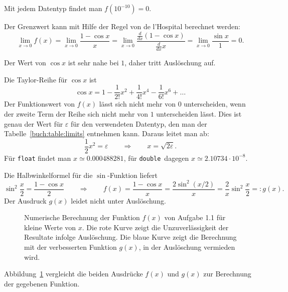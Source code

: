 \begin{loesung}
\begin{teilaufgaben}
\item
Mit jedem Datentyp findet man $f(10^{-10})=0$.
\item
Der Grenzwert kann mit Hilfe der Regel von de l'Hospital berechnet werden:
%
\[
\lim_{x\to 0}f(x)
=
\lim_{x\to 0}\frac{1-\cos x}{x}
=
\lim_{x\to 0}\frac{\frac{d}{dx}(1-\cos x)}{\frac{d}{dx} x}
=
\lim_{x\to 0} \frac{\sin x}{1} = 0.
\]
\item
Der Wert von $\cos x$ ist sehr nahe bei $1$, daher tritt Auslöschung auf.
\item
Die Taylor-Reihe für $\cos x$ ist
\[
\cos x = 1 -\frac1{2!}x^2 + \frac{1}{4!}x^4 - \frac{1}{6!}x^6 +\dots
\]
Der Funktionswert von $f(x)$ lässt sich nicht mehr von $0$ unterscheiden,
wenn der zweite Term der Reihe sich nicht mehr von $1$ unterscheiden lässt.
Dies ist genau der Wert für $\varepsilon$ für den verwendeten Datentyp,
den man der Tabelle~\ref{buch:table:limits} entnehmen kann.
%
Daraus leitet man ab:
\[
\frac12x^2 = \varepsilon
\qquad\Rightarrow\qquad
x=\sqrt{2\varepsilon}.
\]
Für \texttt{float} findet man $x\simeq 0.000488281$,
für \texttt{double} dagegen $x\simeq 2.10734\cdot 10^{-8}$.
\item
Die Halbwinkelformel für die $\sin$-Funktion liefert
%
\[
\sin^2 \frac{x}2
=
\frac{1-\cos x}{2}
\qquad\Rightarrow\qquad
f(x)
=
\frac{1-\cos x}{x}
=
\frac{2\sin^2(x/2)}{x}
=
\frac{2}{x}\sin^2\frac{x}{2}
=:
g(x).
\]
Der Ausdruck $g(x)$ leidet nicht unter Auslöschung.
%
\qedhere
\end{teilaufgaben}
\begin{figure}
\centering
{}
\caption{Numerische Berechnung der Funktion $f(x)$ von Aufgabe 1.1 für
kleine Werte von $x$.
Die rote Kurve zeigt die Unzuverlässigkeit der Resultate infolge
Auslöschung.
Die blaue Kurve zeigt die Berechnung mit der verbesserten Funktion
$g(x)$, in der Auslöschung vermieden wird.
%
\label{buch:figure:1001}}
\end{figure}
Abbildung~\ref{buch:figure:1001} vergleicht die beiden Ausdrücke
$f(x)$ und $g(x)$ zur Berechnung der gegebenen Funktion.
\end{loesung}


